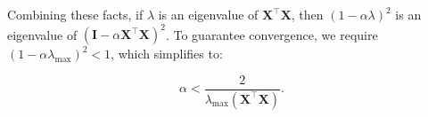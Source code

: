Combining these facts, if \(\lambda\) is an eigenvalue of \(\mathbf{X}^\top \mathbf{X}\), then \((1 - \alpha \lambda)^2\) is an eigenvalue of \((\mathbf{I} - \alpha \mathbf{X}^\top \mathbf{X})^2\). To guarantee convergence, we require \((1 - \alpha \lambda_{\max})^2 < 1\), which simplifies to:

\[
\alpha < \frac{2}{\lambda_{\max}(\mathbf{X}^\top \mathbf{X})}.
\]
